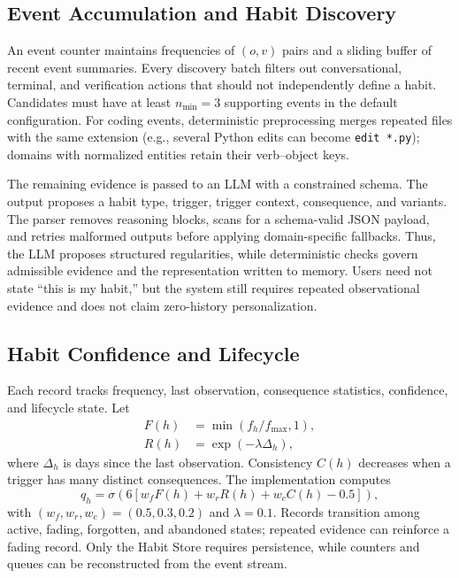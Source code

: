 \documentclass[sigconf,anonymous,review]{acmart}
\begin{document}
\subsection{Event Accumulation and Habit Discovery}

An event counter maintains frequencies of $(o,v)$ pairs and a sliding buffer of recent event summaries.
Every discovery batch filters out conversational, terminal, and verification actions that should not independently define a habit.
Candidates must have at least $n_{\min}=3$ supporting events in the default configuration.
For coding events, deterministic preprocessing merges repeated files with the same extension (e.g., several Python edits can become \texttt{edit *.py}); domains with normalized entities retain their verb--object keys.

The remaining evidence is passed to an LLM with a constrained schema.
The output proposes a habit type, trigger, trigger context, consequence, and variants.
The parser removes reasoning blocks, scans for a schema-valid JSON payload, and retries malformed outputs before applying domain-specific fallbacks.
Thus, the LLM proposes structured regularities, while deterministic checks govern admissible evidence and the representation written to memory.
Users need not state ``this is my habit,'' but the system still requires repeated observational evidence and does not claim zero-history personalization.

\subsection{Habit Confidence and Lifecycle}

Each record tracks frequency, last observation, consequence statistics, confidence, and lifecycle state.
Let
\begin{align}
F(h) &= \min(f_h/f_{\max},1),\\
R(h) &= \exp(-\lambda \Delta_h),
\end{align}
where $\Delta_h$ is days since the last observation.
Consistency $C(h)$ decreases when a trigger has many distinct consequences.
The implementation computes
\begin{equation}
q_h=\sigma\!\left(6\left[w_fF(h)+w_rR(h)+w_cC(h)-0.5\right]\right),
\end{equation}
with $(w_f,w_r,w_c)=(0.5,0.3,0.2)$ and $\lambda=0.1$.
Records transition among active, fading, forgotten, and abandoned states; repeated evidence can reinforce a fading record.
Only the Habit Store requires persistence, while counters and queues can be reconstructed from the event stream.
\end{document}
